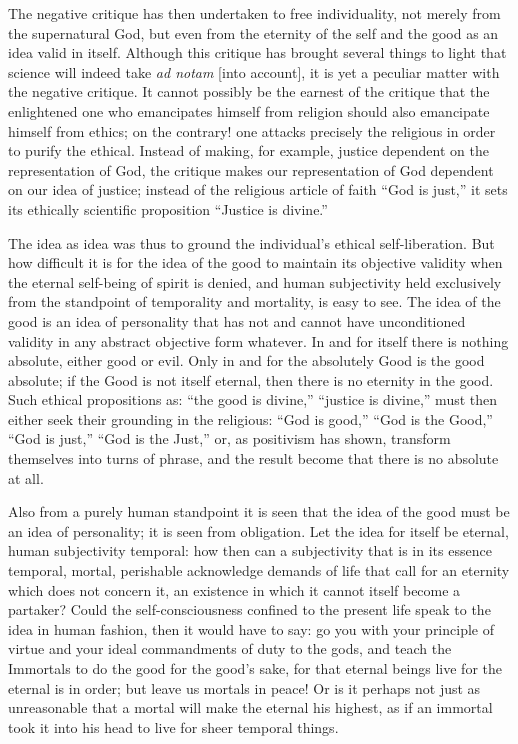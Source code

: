 \documentclass[12pt]{book}
\begin{document}
The negative critique has then undertaken to free individuality, not merely from the supernatural
God, but even from the eternity of the self and the good as an idea valid in itself. Although this
critique has brought several things to light that science will indeed take \textit{ad notam}
[into account], it is yet a peculiar matter with the negative critique. It cannot possibly be the
earnest of the critique that the enlightened one who emancipates himself from religion should also
emancipate himself from ethics; on the contrary! one attacks precisely the religious in order to
purify the ethical. Instead of making, for example, justice dependent on the representation of
God, the critique makes our representation of God dependent on our idea of justice; instead of the
religious article of faith ``God is just,'' it sets its ethically scientific proposition ``Justice
is divine.''

The idea as idea was thus to ground the individual's ethical self-liberation. But how difficult it
is for the idea of the good to maintain its objective validity when the eternal self-being of
spirit is denied, and human subjectivity held exclusively from the standpoint of temporality and
mortality, is easy to see. The idea of the good is an idea of personality that has not and cannot
have unconditioned validity in any abstract objective form whatever. In and for itself there is
nothing absolute, either good or evil. Only in and for the absolutely Good is the good absolute;
if the Good is not itself eternal, then there is no eternity in the good. Such ethical
propositions as: ``the good is divine,'' ``justice is divine,'' must then either seek their
grounding in the religious: ``God is good,'' ``God is the Good,'' ``God is just,'' ``God is the
Just,'' or, as positivism has shown, transform themselves into turns of phrase, and the result
become that there is no absolute at all.

Also from a purely human standpoint it is seen that the idea of the good must be an idea of
personality; it is seen from obligation. Let the idea for itself be eternal, human subjectivity
temporal: how then can a subjectivity that is in its essence temporal, mortal, perishable
acknowledge demands of life that call for an eternity which does not concern it, an existence in
which it cannot itself become a partaker? Could the self-consciousness confined to the present life
speak to the idea in human fashion, then it would have to say: go you with your principle of virtue
and your ideal commandments of duty to the gods, and teach the Immortals to do the good for the
good's sake, for that eternal beings live for the eternal is in order; but leave us mortals in
peace! Or is it perhaps not just as unreasonable that a mortal will make the eternal his highest,
as if an immortal took it into his head to live for sheer temporal things.
\end{document}
